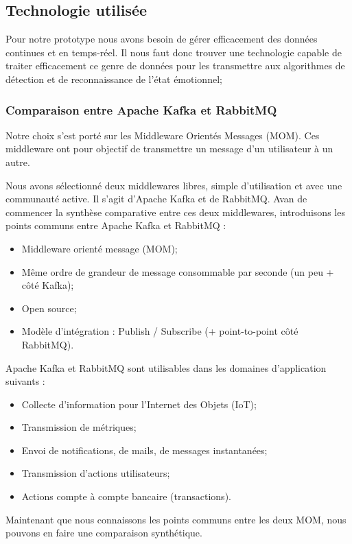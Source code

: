 \documentclass{article}
\begin{document}
	\subsection{Technologie utilisée}
		Pour notre prototype nous avons besoin de gérer efficacement des données continues et en temps-réel.
		Il nous faut donc trouver une technologie capable de traiter efficacement ce genre de données pour les transmettre aux algorithmes de détection et de reconnaissance de l'état émotionnel;
		\subsubsection{Comparaison entre Apache Kafka et RabbitMQ}
			Notre choix s'est porté sur les Middleware Orientés Messages (MOM).
			Ces middleware ont pour objectif de transmettre un message d'un utilisateur à un autre.\par
			Nous avons sélectionné deux middlewares libres, simple d'utilisation et avec une communauté active.
			Il s'agit d'Apache Kafka et de RabbitMQ.
			Avan de commencer la synthèse comparative entre ces deux middlewares,  introduisons les points communs entre Apache Kafka et RabbitMQ :
			\begin{itemize}
				\item Middleware orienté message (MOM);
				\item Même ordre de grandeur de message consommable par seconde (un peu + côté Kafka);
				\item Open source;
				\item Modèle d’intégration : Publish / Subscribe (+ point-to-point côté RabbitMQ).
			\end{itemize}
			Apache Kafka et RabbitMQ sont utilisables dans les domaines d'application suivants :
			\begin{itemize}
				\item Collecte d’information pour l'Internet des Objets (IoT);
				\item Transmission de métriques;
				\item Envoi de notifications, de mails, de messages instantanées;
				\item Transmission d’actions utilisateurs;
				\item Actions compte à compte bancaire (transactions).
			\end{itemize}\par
			Maintenant que nous connaissons les points communs entre les deux MOM, nous pouvons en faire une comparaison synthétique.\par
\end{document}
